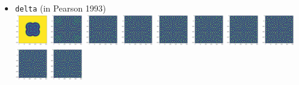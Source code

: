\begin{itemize}
\item {\tt delta} (in Pearson 1993)\\
\includegraphics[width=1.4cm]{python_codes/fieldstone_171/pearson93/delta_solution_0001000_u}
\includegraphics[width=1.4cm]{python_codes/fieldstone_171/pearson93/delta_solution_0005000_u}
\includegraphics[width=1.4cm]{python_codes/fieldstone_171/pearson93/delta_solution_0010000_u}
\includegraphics[width=1.4cm]{python_codes/fieldstone_171/pearson93/delta_solution_0015000_u}
\includegraphics[width=1.4cm]{python_codes/fieldstone_171/pearson93/delta_solution_0020000_u}
\includegraphics[width=1.4cm]{python_codes/fieldstone_171/pearson93/delta_solution_0030000_u}
\includegraphics[width=1.4cm]{python_codes/fieldstone_171/pearson93/delta_solution_0040000_u}
\includegraphics[width=1.4cm]{python_codes/fieldstone_171/pearson93/delta_solution_0050000_u}
\includegraphics[width=1.4cm]{python_codes/fieldstone_171/pearson93/delta_solution_0075000_u}
\includegraphics[width=1.4cm]{python_codes/fieldstone_171/pearson93/delta_solution_final_u}


\end{itemize}
